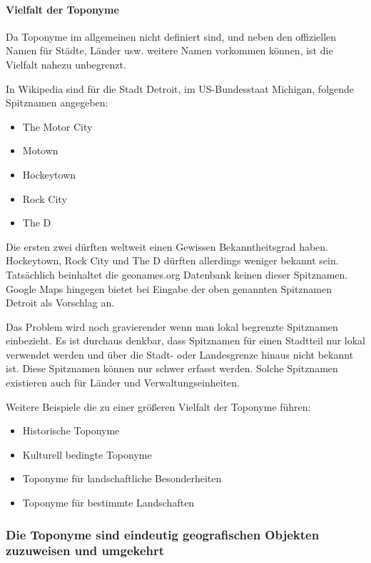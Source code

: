 				\paragraph{Vielfalt der Toponyme} 

					Da Toponyme im allgemeinen nicht definiert sind, und neben den offiziellen Namen für Städte, Länder usw. weitere Namen vorkommen können, ist die Vielfalt nahezu unbegrenzt.
					
					In Wikipedia sind für die Stadt Detroit, im US-Bundesstaat Michigan, folgende Spitznamen angegeben:
					
					\begin{itemize}
						\item The Motor City
						\item Motown
						\item Hockeytown
						\item Rock City
						\item The D
					\end{itemize}

					Die ersten zwei dürften weltweit einen Gewissen Bekanntheitsgrad haben. 
					Hockeytown, Rock City und The D dürften allerdings weniger bekannt sein.
					Tatsächlich beinhaltet die geonames.org Datenbank keinen dieser Spitznamen.
					Google Maps hingegen bietet bei Eingabe der oben genannten Spitznamen Detroit als Vorschlag an.

					Das Problem wird noch gravierender wenn man lokal begrenzte Spitznamen einbezieht.
					Es ist durchaus denkbar, dass Spitznamen für einen Stadtteil nur lokal verwendet werden und über die Stadt- oder Landesgrenze hinaus nicht bekannt ist. 
					Diese Spitznamen können nur schwer erfasst werden.
					Solche Spitznamen existieren auch für Länder und Verwaltungseinheiten. 

					Weitere Beispiele die zu einer größeren Vielfalt der Toponyme führen:

					\begin{itemize}
						\item Historische Toponyme
						\item Kulturell bedingte Toponyme
						\item Toponyme für landschaftliche Besonderheiten
						\item Toponyme für bestimmte Landschaften
					\end{itemize}
		
			\subsubsection{Die Toponyme sind eindeutig geografischen Objekten zuzuweisen und umgekehrt} 

